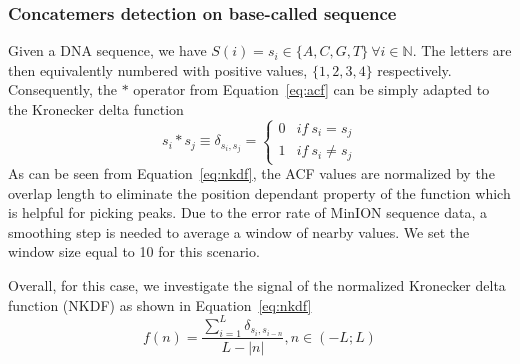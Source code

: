 \subsubsection{Concatemers detection on base-called sequence}
Given a DNA sequence, we have $S(i)=s_i \in \{A,C,G,T\} \: \forall i \in \mathbb{N}$. The letters are then equivalently numbered with positive values, \EG{} $\{1,2,3,4\}$ respectively.
Consequently, the $\ast$ operator from Equation~\ref{eq:acf} can be simply adapted to the Kronecker delta function
\[
s_i \ast s_j \equiv \delta_{s_i,s_j} = \left\{
\begin{array}{ll}
0     &  if \: s_i = s_j\\
1     &  if \: s_i \neq s_j
\end{array}
\right.
\]
As can be seen from Equation~\ref{eq:nkdf}, the ACF values are normalized by the overlap length to eliminate the position dependant property of the function which is helpful for picking peaks. Due to the error rate of MinION sequence data, a smoothing step is needed to average a window of nearby values. We set the window size equal to 10 for this scenario. 

Overall, for this case, we investigate the signal of the normalized Kronecker delta function (NKDF) as shown in Equation~\ref{eq:nkdf}
\begin{equation}
\label{eq:nkdf}
f(n) = \frac{\displaystyle \sum_{i=1}^{L}{\delta_{s_i,s_{i-n}}}}
            {\displaystyle L-|n|}
            , n \in (-L;L)
\end{equation}

